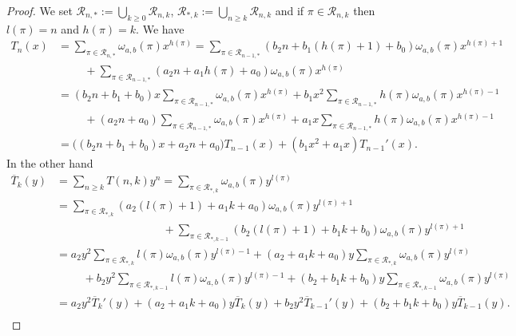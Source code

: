 \documentclass[12pt,a4paper]{article}
\theoremstyle{definition} %
\theoremstyle{remark}
\theoremstyle{examples}
\newenvironment{porofo}[1][Proof]{%
	\begin{proof}[#1]%
	}{%
	\end{proof}%
}
\begin{document}
\begin{porofo}
	 We set  $\displaystyle\mathcal{R}_{n,*}:=\bigcup_{k\geq 0}\mathcal{R}_{n,k}$, $\displaystyle\mathcal{R}_{*,k}:=\bigcup_{n\geq k}\mathcal{R}_{n,k}$ and if $\pi\in\mathcal{R}_{n,k}$ then $l(\pi)=n$ and $h(\pi)=k$.
	We have
	 \begin{align*} T_n(x)&\displaystyle=\sum_{\pi\in\mathcal{R}_{n,*}}\omega_{a,b}(\pi)x^{h(\pi)}=\sum_{\pi\in\mathcal{R}_{n-1,*}}(b_2n+b_1(h(\pi)+1)+b_0)\omega_{a,b}(\pi)x^{h(\pi)+1}\\
		&\hspace{1cm} \displaystyle+\sum_{\pi\in\mathcal{R}_{n-1,*}}(a_2n+a_1h(\pi)+a_0)\omega_{a,b}(\pi)x^{h(\pi)}\\
		&\displaystyle=(b_2n+b_1+b_0)x\sum_{\pi\in\mathcal{R}_{n-1,*}}\omega_{a,b}(\pi)x^{h(\pi)}+b_1x^2\sum_{\pi\in\mathcal{R}_{n-1,*}}h(\pi)\omega_{a,b}(\pi)x^{h(\pi)-1}\\
		&\hspace{1cm} \displaystyle+(a_2n+a_0)\sum_{\pi\in\mathcal{R}_{n-1,*}}\omega_{a,b}(\pi)x^{h(\pi)}  +a_1x\sum_{\pi\in\mathcal{R}_{n-1,*}}h(\pi)\omega_{a,b}(\pi)x^{h(\pi)-1}\\
		&=\big((b_2n+b_1+b_0)x+a_2n+a_0\big)T_{n-1}(x)+(b_1x^2+a_1x)T_{n-1}'(x).
	\end{align*}
\noindent	In the other hand 
	\begin{align*}
		\overline{T}_k(y)&\displaystyle=\sum_{n\geq k}T(n,k)y^n= \sum_{\pi\in\mathcal{R}_{*,k}}\omega_{a,b}(\pi)y^{l(\pi)}\\&\displaystyle=\sum_{\pi\in\mathcal{R}_{*,k}}(a_2(l(\pi)+1)+a_1k+a_0)\omega_{a,b}(\pi)y^{l(\pi)+1}\\
		&\hspace{4cm} \displaystyle+\sum_{\pi\in\mathcal{R}_{*,k-1}}(b_2(l(\pi)+1)+b_1k+b_0)\omega_{a,b}(\pi)y^{l(\pi)+1}\\
		&\displaystyle=a_2y^2\sum_{\pi\in\mathcal{R}_{*,k}}l(\pi)\omega_{a,b}(\pi)y^{l(\pi)-1}+(a_2+a_1k+a_0)y\sum_{\pi\in\mathcal{R}_{*,k}}\omega_{a,b}(\pi)y^{l(\pi)}\\
		& \hspace{1cm} \displaystyle+b_2y^2\sum_{\pi\in\mathcal{R}_{*,k-1}}l(\pi)\omega_{a,b}(\pi)y^{l(\pi)-1}+(b_2+b_1k+b_0)y\sum_{\pi\in\mathcal{R}_{*,k-1}}\omega_{a,b}(\pi)y^{l(\pi)}\\
		&\displaystyle=a_2y^2\overline{T}_k'(y)+(a_2+a_1k+a_0)y\overline{T}_k(y)+b_2y^2\overline{T}_{k-1}'(y)+(b_2+b_1k+b_0)y\overline{T}_{k-1}(y).\\
	\end{align*}
\end{porofo}
\end{document}
